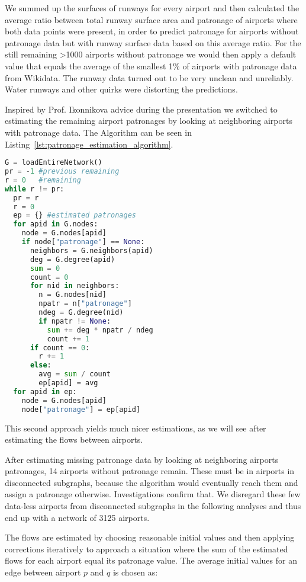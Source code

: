 \documentclass[twocolumn]{tum-article}
\begin{document}
We summed up the surfaces of runways for every airport and then calculated the average ratio between total runway surface area and patronage of airports where both data points were present, in order to predict patronage for airports without patronage data but with runway surface data based on this average ratio. For the still remaining >1000 airports without patronage we would then apply a default value that equals the average of the smallest 1\% of airports with patronage data from Wikidata. 
The runway data turned out to be very unclean and unreliably. Water runways and other quirks were distorting the predictions. 

Inspired by Prof. Ikonnikova advice during the presentation we switched to estimating the remaining airport patronages by looking at neighboring airports with patronage data. The Algorithm can be seen in Listing~\ref{lst:patronage_estimation_algorithm}.
\begin{lstlisting}[language=Python, caption={Patronage estimation algorithm, that using neighboring airport's patronage data}, label=lst:patronage_estimation_algorithm]
G = loadEntireNetwork()
pr = -1 #previous remaining
r = 0   #remaining
while r != pr:
  pr = r
  r = 0
  ep = {} #estimated patronages
  for apid in G.nodes:
    node = G.nodes[apid]
    if node["patronage"] == None:
      neighbors = G.neighbors(apid) 
      deg = G.degree(apid)
      sum = 0
      count = 0
      for nid in neighbors: 
        n = G.nodes[nid]
        npatr = n["patronage"]
        ndeg = G.degree(nid) 
        if npatr != None: 
          sum += deg * npatr / ndeg
          count += 1
      if count == 0:
        r += 1
      else:
        avg = sum / count
        ep[apid] = avg 
  for apid in ep: 
    node = G.nodes[apid]
    node["patronage"] = ep[apid]
\end{lstlisting}
This second approach yields much nicer estimations, as we will see after estimating the flows between airports. 

After estimating missing patronage data by looking at neighboring airports patronages, 14 airports without patronage remain. These must be in airports in disconnected subgraphs, because the algorithm would eventually reach them and assign a patronage otherwise. Investigations confirm that. We disregard these few data-less airports from disconnected subgraphs in the following analyses and thus end up with a network of 3125 airports. 

The flows are estimated by choosing reasonable initial values and then applying corrections iteratively to approach a situation where the sum of the estimated flows for each airport equal its patronage value.
The average initial values for an edge between airport $p$ and $q$ is chosen as: 
\end{document}
